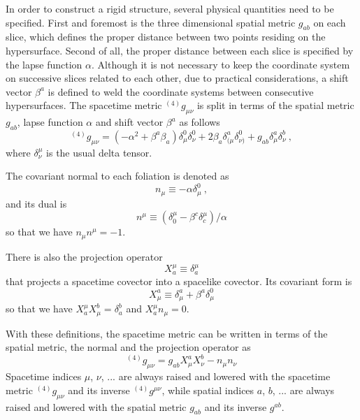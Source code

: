 In order to  construct a rigid structure, several physical quantities need to be specified. First and foremost is the three dimensional spatial metric $g_{ab}$ on each slice, which defines the proper distance between two points residing on the hypersurface. Second of all, the proper distance between each slice is specified by the lapse function $\alpha$. Although it is not necessary to keep the coordinate system on successive slices related to each other, due to practical considerations, a shift vector $\beta^{a}$ is defined to weld the coordinate systems between consecutive hypersurfaces. The spacetime metric $^{(4)}g_{\mu\nu}$ is split in terms of the spatial metric $g_{ab}$, lapse function $\alpha$ and shift vector $\beta^{a}$ as follows
\begin{equation}
	{}^{\left(4\right)}g_{\mu\nu} = \left(-\alpha^2 + \beta^{a}\beta_{a}\right)\delta_\mu^0\delta_\nu^0 
	+ 2\beta_{a}\delta_{(\mu}^a\delta_{\nu)}^0 + g_{ab} \delta^a_\mu \delta^b_\nu \ ,
\end{equation}
where $\delta^{\mu}_{\nu}$ is the usual delta tensor. 

The covariant normal to each foliation is denoted as
\begin{equation}\label{normal covector}
n_{\mu} \equiv -\alpha\delta^{0}_{\mu} \ ,
\end{equation}
and its dual is
\begin{equation}\label{normal vector}
n^{\mu} \equiv \left(\delta^{\mu}_{0} - \beta^{c}\delta^{\mu}_{c}\right)/\alpha
\end{equation}
so that we have $n_{\mu}n^{\mu} = -1$. 

There is also the projection operator
\begin{equation}\label{projection 1}
X^{\mu}_{a} \equiv \delta^{\mu}_{a}
\end{equation}
that projects a spacetime covector into a spacelike covector. Its covariant form is
\begin{equation}\label{projection 2}
X^{a}_{\mu} \equiv \delta^{a}_{\mu} + \beta^{a}\delta^{0}_{\mu}
\end{equation}
so that we have $X^{\mu}_{a}X^{b}_{\mu} = \delta^{b}_{a}$ and $X^{\mu}_{a}n_{\mu} = 0$. 

With these definitions, the spacetime metric can be written in terms of the spatial metric, the normal and the projection operator as
\begin{equation}\label{spacetime metric 3 + 1}
^{\left(4\right)}g_{\mu\nu} = g_{ab}X^{a}_{\mu}X^{b}_{\nu} - n_{\mu}n_{\nu}
\end{equation}
Spacetime indices $\mu$, $\nu$, ... are always raised and lowered with the spacetime metric $^{\left(4\right)}g_{\mu\nu}$ and its inverse $^{\left(4\right)}g^{\mu\nu}$, while spatial indices $a$, $b$, ... are always raised and lowered with the spatial metric $g_{ab}$ and its inverse $g^{ab}$. 

